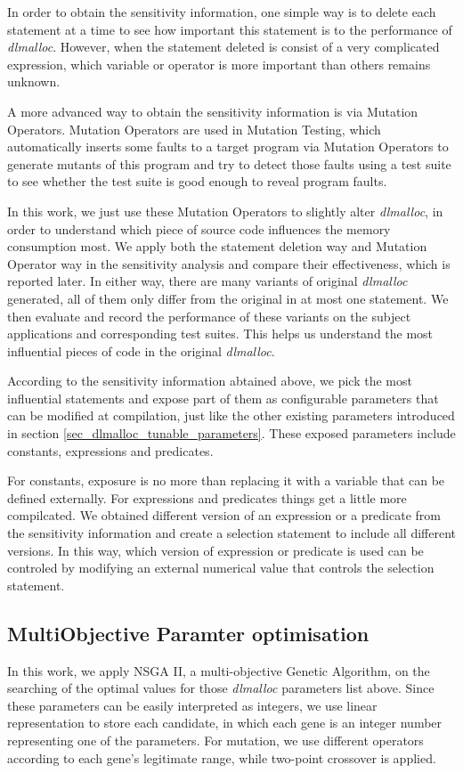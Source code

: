 In order to obtain the sensitivity information, one simple way is to delete each statement at a time to see how important this statement is to the performance of \emph{dlmalloc}. However, when the statement deleted is consist of a very complicated expression, which variable or operator is more important than others remains unknown. 

A more advanced way to obtain the sensitivity information is via Mutation Operators. Mutation Operators are used in Mutation Testing, which automatically inserts some faults to a target program via Mutation Operators to generate mutants of this program and try to detect those faults using a test suite to see whether the test suite is good enough to reveal program faults. 

In this work, we just use these Mutation Operators to slightly alter \emph{dlmalloc}, in order to understand which piece of source code influences the memory consumption most. We apply both the statement deletion way and Mutation Operator way in the sensitivity analysis and compare their effectiveness, which is reported later. In either way, there are many variants of original \emph{dlmalloc} generated, all of them only differ from the original in at most one statement. We then evaluate and record the performance of these variants on the subject applications and corresponding test suites. This helps us understand the most influential pieces of code in the original \emph{dlmalloc}.

According to the sensitivity information abtained above, we pick the most influential statements and expose part of them as configurable parameters that can be modified at compilation, just like the other existing parameters introduced in section \ref{sec_dlmalloc_tunable_parameters}. These exposed parameters include constants, expressions and predicates. 

For constants, exposure is no more than replacing it with a variable that can be defined externally. For expressions and predicates things get a little more compilcated. We obtained different version of an expression or a predicate from the sensitivity information and create a selection statement to include all different versions. In this way, which version of expression or predicate is used can be controled by modifying an external numerical value that controls the selection statement.


\subsection{MultiObjective Paramter optimisation}
\label{sec_nsgaii}
In this work, we apply NSGA II\cite{996017}, a multi-objective Genetic Algorithm, on the searching of the optimal values for those \emph{dlmalloc} parameters list above.
Since these parameters can be easily interpreted as integers, we use linear representation to store each candidate, in which each gene is an integer number representing one of the parameters. For mutation, we use different operators according to each gene's legitimate range, while two-point crossover is applied.

